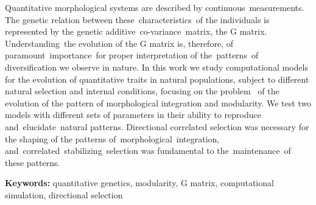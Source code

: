 \noindent
Quantitative morphological systems are described by continuous measurements. 
The genetic relation between these characteristics of the individuals is
represented by the genetic additive co-variance matrix, the G matrix.
Understanding the evolution of the G matrix is, therefore, of
paramount importance for proper interpretation of the patterns of
diversification we observe in nature.
In this work we study computational models for the evolution of
quantitative traits in natural populations, subject to different natural
selection and internal conditions, focusing on the problem  of the
evolution of the pattern of morphological integration and modularity. 
We test two models with different sets of parameters in their ability to
reproduce and elucidate natural patterns. 
Directional correlated selection was necessary for the shaping of the
patterns of morphological integration,
and correlated stabilizing selection was fundamental to
the maintenance of these patterns.
\par
\vspace{1em}
\noindent\textbf{Keywords:} quantitative genetics, modularity, G matrix,
computational simulation, directional selection


\newpage

\listoffigures

\listoftables

\printnomenclature

\tableofcontents
